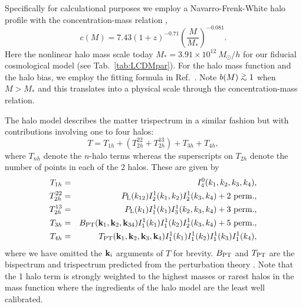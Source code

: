 \documentclass[prd,twocolumn,amsmath,amssymb,floatfix,superscriptaddress]{revtex4-1}
\newcommand{\simgt}{\lower.5ex\hbox{$\; \buildrel > \over \sim \;$}}
\newcommand{\bk}{{\bf k}}
\newcommand{\lin}{{\rm L}}
\begin{document}
Specifically for calculational purposes we employ a Navarro-Frenk-White halo profile
\citep{Navarroetal:97} with the concentration-mass relation   \cite{Duffyetal:08},
\begin{equation}
c(M)=7.43(1+z)^{-0.71}\left(\frac{M}{M_\ast}\right)^{-0.081}.
\end{equation}
Here 
 the nonlinear halo mass scale today $M_\ast=3.91\times
10^{12}~M_\odot/h$ for our fiducial cosmological model (see Tab.~\ref{tab:LCDMpar}). For the halo
mass function and the halo bias, we employ the fitting formula in
Ref.~\cite{Bhattacharyaetal:10}. Note $b(M)\simgt 1$ when $M>M_\ast$ and this translates into a physical scale through the concentration-mass relation.  


The halo model describes the matter trispectrum in a similar fashion but
with contributions involving one to four halos:
%
\begin{equation}
T=T_{1h}+\left(T_{2h}^{22}+T_{2h}^{13}\right)+T_{3h}+T_{4h}, 
\end{equation}
%
where $T_{nh}$ denote the $n$-halo terms whereas the superscripts on $T_{2h}$ denote the number of points in each of the 2 halos. These are
given by \cite{CoorayHu:01,Takada:2013wfa}
\begin{eqnarray}
 T_{1h}&=&
I^0_4(k_1,k_2,k_3,k_4),\\
T_{2h}^{22} &=&
P_\lin(k_{12})I^1_{2}(k_1,k_2)I^1_{2}(k_3,k_4)+
\mbox{2 perm.},\nonumber\\
T_{2h}^{13} &=&
P_\lin(k_1)I_1^1(k_1)I^1_{3}(k_2,k_3,k_4)+\mbox{3 perm.},\nonumber\\
 T_{3h}&=&
B_{\rm PT}(\bk_1,\bk_2,\bk_{34})
I^1_1(k_1)I^1_1(k_2)I^1_2(k_3,k_4)
+\mbox{5 perm.},\nonumber\\
T_{4h}&=& T_{\rm PT}(\bk_1,\bk_2,\bk_3,\bk_4)
I^1_1(k_1)I^1_1(k_2)I^1_1(k_3)I^1_1(k_4), \nonumber
\end{eqnarray}
%
where we have omitted the $\bk_i$ arguments of $T$ for brevity.   
$B_{\rm PT}$ and $T_{\rm PT}$ are the bispectrum and trispectrum
predicted from the perturbation theory \cite{Bernardeauetal:02}. 
{Note that the 1 halo term is strongly weighted to the highest masses or rarest halos
in the mass function where the ingredients of the halo model are the least well calibrated.}
\end{document}
